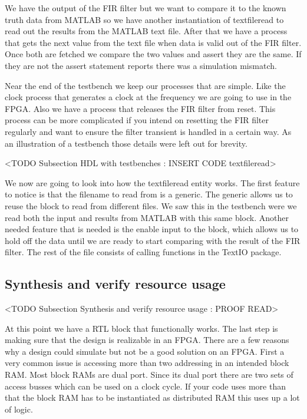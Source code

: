 We have the output of the \ac{FIR} filter but we want to compare it to the known truth data from MATLAB so we have another instantiation of textfileread to read out the results from the MATLAB text file. After that we have a process that gets the next value from the text file when data is valid out of the \ac{FIR} filter. Once both are fetched we compare the two values and assert they are the same. If they are not the assert statement reports there was a simulation mismatch.

Near the end of the testbench we keep our processes that are simple. Like the clock process that generates a clock at the frequency we are going to use in the \ac{FPGA}. Also we have a process that releases the \ac{FIR} filter from reset. This process can be more complicated if you intend on resetting the \ac{FIR} filter regularly and want to ensure the filter transient is handled in a certain way. As an illustration of a testbench those details were left out for brevity.

<TODO Subsection HDL with testbenches : INSERT CODE textfileread>

We now are going to look into how the textfileread entity works. The first feature to notice is that the filename to read from is a generic. The generic allows us to reuse the block to read from different files. We saw this in the testbench were we read both the input and results from MATLAB with this same block. Another needed feature that is needed is the enable input to the block, which allows us to hold off the data until we are ready to start comparing with the result of the \ac{FIR} filter. The rest of the file consists of calling functions in the TextIO package.

	
	
	
\subsection{Synthesis and verify resource usage}
	<TODO Subsection Synthesis and verify resource usage : PROOF READ>

At this point we have a \ac{RTL} block that functionally works. The last step is making sure that the design is realizable in an \ac{FPGA}. There are a few reasons why a design could simulate but not be a good solution on an \ac{FPGA}. First a very common issue is accessing more than two addressing in an intended block \ac{RAM}. Most block \ac{RAM}s are dual port. Since its dual port there are two sets of access busses which can be used on a clock cycle. If your code uses more than that the block \ac{RAM} has to be instantiated as distributed \ac{RAM} this uses up a lot of logic.

